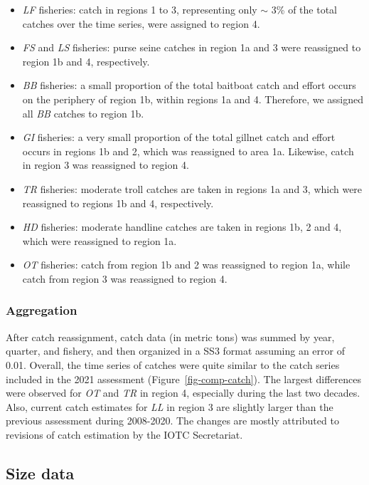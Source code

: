 \documentclass[
]{scrartcl}
\begin{document}
\begin{itemize}
\item
  \emph{LF} fisheries: catch in regions 1 to 3, representing only
  \(\sim\) 3\% of the total catches over the time series, were assigned
  to region 4.
\item
  \emph{FS} and \emph{LS} fisheries: purse seine catches in region 1a
  and 3 were reassigned to region 1b and 4, respectively.
\item
  \emph{BB} fisheries: a small proportion of the total baitboat catch
  and effort occurs on the periphery of region 1b, within regions 1a and
  4. Therefore, we assigned all \emph{BB} catches to region 1b.
\item
  \emph{GI} fisheries: a very small proportion of the total gillnet
  catch and effort occurs in regions 1b and 2, which was reassigned to
  area 1a. Likewise, catch in region 3 was reassigned to region 4.
\item
  \emph{TR} fisheries: moderate troll catches are taken in regions 1a
  and 3, which were reassigned to regions 1b and 4, respectively.
\item
  \emph{HD} fisheries: moderate handline catches are taken in regions
  1b, 2 and 4, which were reassigned to region 1a.
\item
  \emph{OT} fisheries: catch from region 1b and 2 was reassigned to
  region 1a, while catch from region 3 was reassigned to region 4.
\end{itemize}

\subsubsection{Aggregation}\label{aggregation}

After catch reassignment, catch data (in metric tons) was summed by
year, quarter, and fishery, and then organized in a SS3 format assuming
an error of 0.01. Overall, the time series of catches were quite similar
to the catch series included in the 2021 assessment
(Figure~\ref{fig-comp-catch}). The largest differences were observed for
\emph{OT} and \emph{TR} in region 4, especially during the last two
decades. Also, current catch estimates for \emph{LL} in region 3 are
slightly larger than the previous assessment during 2008-2020. The
changes are mostly attributed to revisions of catch estimation by the
IOTC Secretariat.

\subsection{Size data}\label{size-data}
\end{document}
